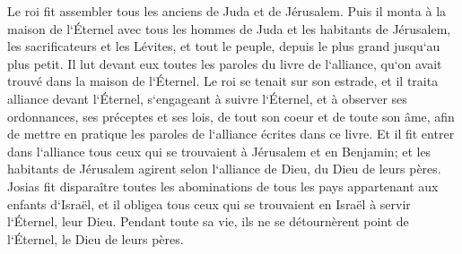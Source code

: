 \verse Le roi fit assembler tous les anciens de Juda et de Jérusalem. 
\verse Puis il monta à la maison de l`Éternel avec tous les hommes de Juda et les habitants de Jérusalem, les sacrificateurs et les Lévites, et tout le peuple, depuis le plus grand jusqu`au plus petit. Il lut devant eux toutes les paroles du livre de l`alliance, qu`on avait trouvé dans la maison de l`Éternel. 
\verse Le roi se tenait sur son estrade, et il traita alliance devant l`Éternel, s`engageant à suivre l`Éternel, et à observer ses ordonnances, ses préceptes et ses lois, de tout son coeur et de toute son âme, afin de mettre en pratique les paroles de l`alliance écrites dans ce livre. 
\verse Et il fit entrer dans l`alliance tous ceux qui se trouvaient à Jérusalem et en Benjamin; et les habitants de Jérusalem agirent selon l`alliance de Dieu, du Dieu de leurs pères. 
\verse Josias fit disparaître toutes les abominations de tous les pays appartenant aux enfants d`Israël, et il obligea tous ceux qui se trouvaient en Israël à servir l`Éternel, leur Dieu. Pendant toute sa vie, ils ne se détournèrent point de l`Éternel, le Dieu de leurs pères. 

\chapter{}

